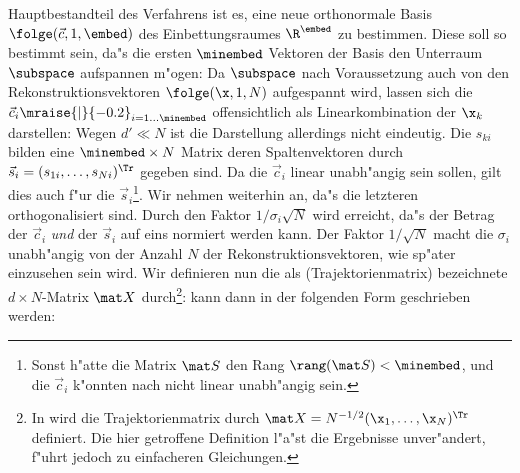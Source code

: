 Hauptbestandteil des Verfahrens ist es, eine neue orthonormale Basis $\folge(\vec
c,1,\embed)$ des Einbettungsraumes $\R^\embed$ zu bestimmen. Diese soll so bestimmt sein,
da"s die ersten $\minembed$ Vektoren der Basis den Unterraum $\subspace$ aufspannen m"ogen:
Da $\subspace$ nach
Voraussetzung auch von den Rekonstruktionsvektoren $\folge(\x,1,N)$ aufgespannt wird,
lassen sich die $\vec c_i\mraise{\rvert}{-0.2}_{i=1\dots\minembed}$ offensichtlich als
Linearkombination der $\x_k$ darstellen:
Wegen $d'\ll N$ ist die Darstellung allerdings nicht eindeutig. Die $s_{ki}$ bilden 
eine $\minembed\times N$ Matrix
deren Spaltenvektoren 
durch $\vec s_i = (s_{1i},\dots,s_{Ni})^\Tr$ gegeben sind.
Da die $\vec c_i$ linear unabh"angig sein sollen, gilt dies auch f"ur die
$\vec s_i$\footnote{Sonst h"atte die Matrix $\mat S$ den
  Rang $\rang(\mat S)<\minembed$, und die $\vec c_i$ k"onnten nach  nicht
  linear unabh"angig sein.}. Wir nehmen weiterhin an, da"s die letzteren orthogonalisiert
sind. Durch den Faktor $1/\sigma_i\sqrt N$ wird erreicht, da"s der Betrag der $\vec c_i$
{\em und} der  $\vec s_i$ auf eins normiert werden kann. Der Faktor $1/\sqrt N$ macht die $\sigma_i$
unabh"angig von der Anzahl $N$ der Rekonstruktionsvektoren, wie sp"ater einzusehen sein wird.  
Wir definieren nun die als \begriff(Trajektorienmatrix) bezeichnete $d\times N$-Matrix $\mat X$ durch\footnote{In
  \cite{Broomhead-king} wird die Trajektorienmatrix durch $\mat X = N^{-1/2}(\x_1, \dots,
  \x_N)^\Tr$ definiert. Die hier getroffene Definition l"a"st die Ergebnisse unver"andert,
  f"uhrt jedoch zu einfacheren Gleichungen.}:
 kann dann in der folgenden Form geschrieben werden: 

